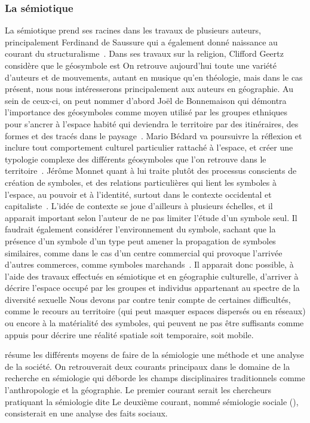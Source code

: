 \subsubsection{La sémiotique}
\label{ssub:la_semiotique}  La sémiotique prend ses racines dans les travaux de plusieurs auteurs, principalement Ferdinand de Saussure qui a également donné naissance au courant du structuralisme~\citep{Noth1995}. 
Dans ses travaux sur la religion, Clifford Geertz considère que le géosymbole est
On retrouve aujourd'hui toute une variété d'auteurs et de mouvements, autant en musique qu'en théologie, mais dans le cas présent, nous nous intéresserons principalement aux auteurs en géographie. 
Au sein de ceux-ci, on peut nommer d'abord Joël de Bonnemaison qui démontra l'importance des géosymboles comme moyen utilisé par les groupes ethniques pour s'ancrer à l'espace habité qui deviendra le territoire par des itinéraires, des formes et des tracés dans le paysage~\citep{Bonnemaison1981}. 
Mario Bédard va poursuivre la réflexion et inclure tout comportement culturel particulier rattaché à l'espace, et créer une typologie complexe des différents géosymboles que l'on retrouve dans le territoire~\citep{Bedard2002}. 
Jérôme Monnet quant à lui traite plutôt des processus conscients de création de symboles, et des relations particulières qui lient les symboles à l'espace, au pouvoir et à l'identité, surtout dans le contexte occidental et capitaliste~\citep{Monnet1998}. 
L'idée de contexte se joue d'ailleurs à plusieurs échelles, et il apparait important selon l'auteur de ne pas limiter l'étude d'un symbole seul. 
Il faudrait également considérer l'environnement du symbole, sachant que la présence d'un symbole d'un type peut amener la propagation de symboles similaires, comme dans le cas d'un centre commercial qui provoque l'arrivée d'autres commerces, comme symboles marchands~\citep[7-8]{Monnet1998}.
Il apparait donc possible, à l'aide des travaux effectués en sémiotique et en géographie culturelle, d'arriver à décrire l'espace occupé par les groupes et individus appartenant au spectre de la diversité sexuelle
Nous devons par contre tenir compte de certaines difficultés, comme le recours au territoire (qui peut masquer espaces dispersés ou en réseaux) ou encore à la matérialité des symboles, qui peuvent ne pas être suffisants comme appuis pour décrire une réalité spatiale soit temporaire, soit mobile.

\citet[105--109]{Rose2012} résume les différents moyens de faire de la sémiologie une méthode et une analyse de la société. 
On retrouverait deux courants principaux dans le domaine de la recherche en sémiologie qui déborde les champs disciplinaires traditionnels comme l'anthropologie et la géographie.
Le premier courant serait les chercheurs pratiquant la sémiologie dite  
Le deuxième courant, nommé sémiologie sociale (), consisterait en une analyse des faits sociaux.

